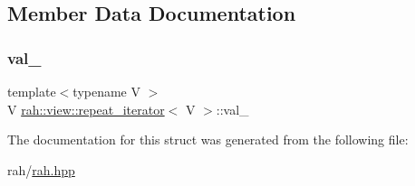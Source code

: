 \subsection{Member Data Documentation}
\mbox{\label{structrah_1_1view_1_1repeat__iterator_a6286ca38cb848630cb870dc6ab42eb79}} 
\subsubsection{\texorpdfstring{val\_}{val\_}}
{\footnotesize\ttfamily template$<$typename V $>$ \\
V \mbox{\hyperlink{structrah_1_1view_1_1repeat__iterator}{rah\+::view\+::repeat\+\_\+iterator}}$<$ V $>$\+::val\+\_\+}



The documentation for this struct was generated from the following file\+:\begin{DoxyCompactItemize}
\item 
rah/\mbox{\hyperlink{rah_8hpp}{rah.\+hpp}}\end{DoxyCompactItemize}
